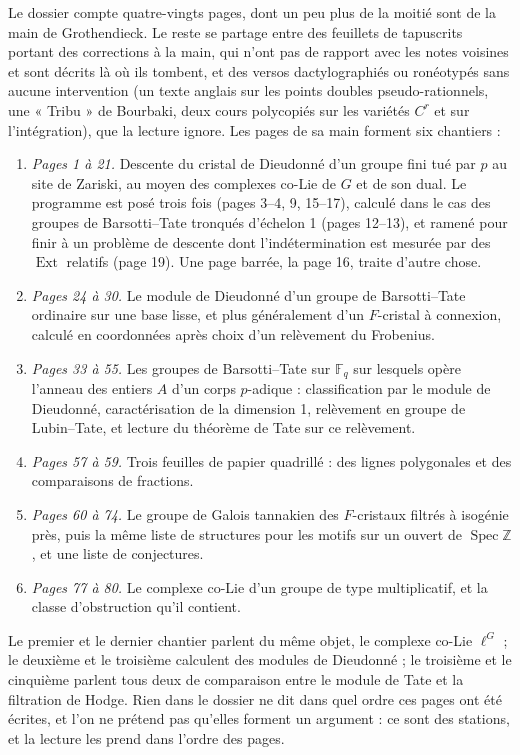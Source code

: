 \documentclass[11pt,a4paper]{article}
\begin{document}
Le dossier compte quatre-vingts pages, dont un peu plus de la moitié sont de
la main de Grothendieck. Le reste se partage entre des feuillets de
tapuscrits portant des corrections à la main, qui n'ont pas de rapport avec
les notes voisines et sont décrits là où ils tombent, et des versos
dactylographiés ou ronéotypés sans aucune intervention (un texte anglais sur
les points doubles pseudo-rationnels, une « Tribu » de Bourbaki, deux cours
polycopiés sur les variétés $C^{r}$ et sur l'intégration), que la lecture
ignore. Les pages de sa main forment six chantiers :

\begin{enumerate}
\item \emph{Pages 1 à 21.} Descente du cristal de Dieudonné d'un groupe fini
tué par $p$ au site de Zariski, au moyen des complexes co-Lie de $G$ et de son
dual. Le programme est posé trois fois (pages 3--4, 9, 15--17), calculé dans
le cas des groupes de Barsotti--Tate tronqués d'échelon 1 (pages 12--13), et
ramené pour finir à un problème de descente dont l'indétermination est
mesurée par des $\operatorname{Ext}$ relatifs (page 19). Une page barrée, la
page 16, traite d'autre chose.
\item \emph{Pages 24 à 30.} Le module de Dieudonné d'un groupe de
Barsotti--Tate ordinaire sur une base lisse, et plus généralement d'un
$F$-cristal à connexion, calculé en coordonnées après choix d'un relèvement
du Frobenius.
\item \emph{Pages 33 à 55.} Les groupes de Barsotti--Tate sur
$\mathbb{F}_{q}$ sur lesquels opère l'anneau des entiers $A$ d'un corps
$p$-adique : classification par le module de Dieudonné, caractérisation de
la dimension 1, relèvement en groupe de Lubin--Tate, et lecture du théorème de
Tate sur ce relèvement.
\item \emph{Pages 57 à 59.} Trois feuilles de papier quadrillé : des lignes
polygonales et des comparaisons de fractions.
\item \emph{Pages 60 à 74.} Le groupe de Galois tannakien des $F$-cristaux
filtrés à isogénie près, puis la même liste de structures pour les motifs sur
un ouvert de $\operatorname{Spec}\mathbb{Z}$, et une liste de conjectures.
\item \emph{Pages 77 à 80.} Le complexe co-Lie d'un groupe de type
multiplicatif, et la classe d'obstruction qu'il contient.
\end{enumerate}

Le premier et le dernier chantier parlent du même objet, le complexe co-Lie
$\ell^{G}$ ; le deuxième et le troisième calculent des modules de Dieudonné ;
le troisième et le cinquième parlent tous deux de comparaison entre le module
de Tate et la filtration de Hodge. Rien dans le dossier ne dit dans quel
ordre ces pages ont été écrites, et l'on ne prétend pas qu'elles forment un
argument : ce sont des stations, et la lecture les prend dans l'ordre des
pages.
\end{document}
